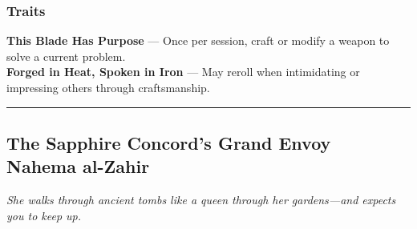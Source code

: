 \begin{paracol}{3}
    \subsubsection{Traits}
        \textbf{This Blade Has Purpose} — Once per session, craft or modify a weapon to solve a current problem.\\
        \textbf{Forged in Heat, Spoken in Iron} — May reroll when intimidating or impressing others through craftsmanship.
\end{paracol}

\vspace{.5\baselineskip}
\hrule
\vspace{.5\baselineskip}

\subsection{{\small The Sapphire Concord’s Grand Envoy}\\ Nahema al-Zahir}
\label{npc:nahema-al-zahir}

\emph{She walks through ancient tombs like a queen through her gardens—and expects you to keep up.}
\vspace{.5\baselineskip}

